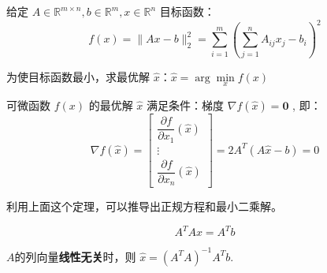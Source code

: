 给定 $ A \in \mathbb{R}^{m \times n}, b \in \mathbb{R}^{m}, x \in \mathbb{R}^{n} $ 目标函数：
\begin{equation}
f(x)=\|A x-b\|_{2}^{2}=\sum_{i=1}^{m}\left(\sum_{j=1}^{n} A_{i j} x_{j}-b_{i}\right)^{2}
\end{equation}

为使目标函数最小，求最优解 $ \hat{x}：\hat{x}=\arg \underset{x}{\min} f(x) $

\begin{theorem}
    可微函数 $ f(x) $ 的最优解 $ \hat{x} $ 满足条件：梯度 $ \nabla f(\hat{x})=\mathbf{0} $ , 即：
\begin{equation}
\nabla f(\hat{x})=\left[\begin{array}{c}
\dfrac{\partial f}{\partial x_{1}}(\hat{x}) \\
\vdots \\
\dfrac{\partial f}{\partial x_{n}}(\hat{x})
\end{array}\right]=2 A^{T}(A \hat{x}-b)=0
\end{equation}
\end{theorem}

利用上面这个定理，可以推导出正规方程和最小二乘解。

\begin{theorem}[正规方程与最小二乘解]
    \begin{equation} A^{T} A x=A^{T} b \end{equation}

    $A$的列向量\textbf{线性无关}时，则 $ \hat{x}=\left(A^{T} A\right)^{-1} A^{T} b $. 
\end{theorem}

